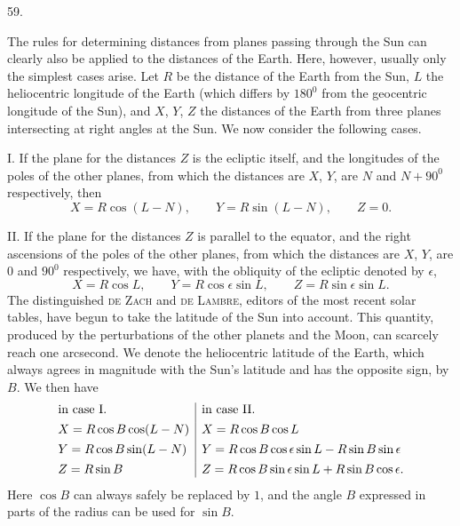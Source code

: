 \par\medskip
{}
\begin{center}59.\end{center}
The rules for determining distances from planes passing through the Sun can clearly also be applied to the distances of the Earth. Here, however, usually only the simplest cases arise. Let $R$ be the distance of the Earth from the Sun, $L$ the heliocentric longitude of the Earth (which differs by $180^0$ from the geocentric longitude of the Sun), and $X$, $Y$, $Z$ the distances of the Earth from three planes intersecting at right angles at the Sun. We now consider the following cases.

I. If the plane for the distances $Z$ is the ecliptic itself, and the longitudes of the poles of the other planes, from which the distances are $X$, $Y$, are $N$ and $N+90^0$ respectively, then
\[
X=R\cos(L-N),\qquad Y=R\sin(L-N),\qquad Z=0.
\]

II. If the plane for the distances $Z$ is parallel to the equator, and the right ascensions of the poles of the other planes, from which the distances are $X$, $Y$, are $0$ and $90^0$ respectively, we have, with the obliquity of the ecliptic denoted by $\epsilon$,
\[
X=R\cos L,\qquad Y=R\cos\epsilon\sin L,\qquad Z=R\sin\epsilon\sin L.
\]
The distinguished \textsc{de Zach} and \textsc{de Lambre}, editors of the most recent solar tables, have begun to take the latitude of the Sun into account. This quantity, produced by the perturbations of the other planets and the Moon, can scarcely reach one arcsecond. We denote the heliocentric latitude of the Earth, which always agrees in magnitude with the Sun's latitude and has the opposite sign, by $B$. We then have
\[
\begin{array}{@{}l|l@{}}
\text{in case I.}&\text{in case II.}\\[.4em]
X=R\cos B\cos(L-N)&X=R\cos B\cos L\\[.4em]
Y=R\cos B\sin(L-N)&Y=R\cos B\cos\epsilon\sin L-R\sin B\sin\epsilon\\[.4em]
Z=R\sin B&Z=R\cos B\sin\epsilon\sin L+R\sin B\cos\epsilon.
\end{array}
\]
Here $\cos B$ can always safely be replaced by $1$, and the angle $B$ expressed in parts of the radius can be used for $\sin B$.

